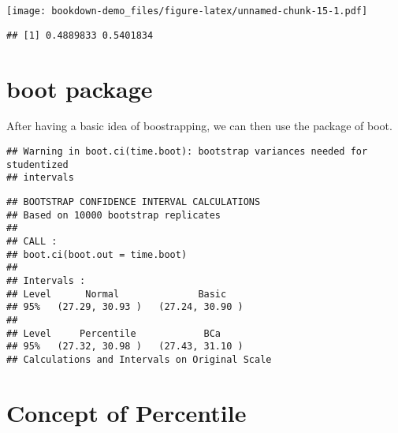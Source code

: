 \documentclass[]{book}
\newenvironment{Shaded}{\begin{snugshade}}{\end{snugshade}}
\newcommand{\ControlFlowTok}[1]{\textcolor[rgb]{0.13,0.29,0.53}{\textbf{#1}}}
\newcommand{\DecValTok}[1]{\textcolor[rgb]{0.00,0.00,0.81}{#1}}
\newcommand{\KeywordTok}[1]{\textcolor[rgb]{0.13,0.29,0.53}{\textbf{#1}}}
\newcommand{\NormalTok}[1]{#1}
\newcommand{\OperatorTok}[1]{\textcolor[rgb]{0.81,0.36,0.00}{\textbf{#1}}}
\newcommand{\StringTok}[1]{\textcolor[rgb]{0.31,0.60,0.02}{#1}}
\begin{document}
\texttt{[image: bookdown-demo\_files/figure-latex/unnamed-chunk-15-1.pdf]}

\begin{verbatim}
## [1] 0.4889833 0.5401834
\end{verbatim}

\hypertarget{boot-package}{%
\section{boot package}\label{boot-package}}

After having a basic idea of boostrapping, we can then use the package of boot.

\begin{Shaded}
\end{Shaded}

\begin{verbatim}
## Warning in boot.ci(time.boot): bootstrap variances needed for studentized
## intervals
\end{verbatim}

\begin{verbatim}
## BOOTSTRAP CONFIDENCE INTERVAL CALCULATIONS
## Based on 10000 bootstrap replicates
## 
## CALL : 
## boot.ci(boot.out = time.boot)
## 
## Intervals : 
## Level      Normal              Basic         
## 95%   (27.29, 30.93 )   (27.24, 30.90 )  
## 
## Level     Percentile            BCa          
## 95%   (27.32, 30.98 )   (27.43, 31.10 )  
## Calculations and Intervals on Original Scale
\end{verbatim}

\hypertarget{concept-of-percentile}{%
\section{Concept of Percentile}\label{concept-of-percentile}}
\end{document}
